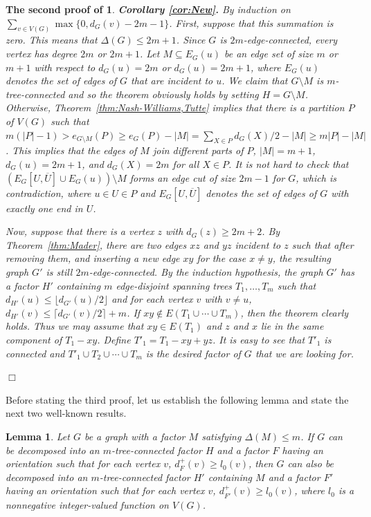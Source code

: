 \documentclass[10pt,bezier]{article}
\newtheorem{prelem}[prethm]{{\bf Lemma}}
\newenvironment{lem}{\begin{prelem}{\hspace{-0.5
em}{\bf.}}}{\end{prelem}}
\newtheorem{preproofs}{{\bf The second proof of }}
\newenvironment{proofs}[1]{\begin{preproofs}{\rm
#1}\hfill{$\Box$}}{\end{preproofs}}
\begin{document}
\begin{proofs}{
\noindent
\hspace*{-4mm}
\textbf{Corollary \ref{cor:New}.}
By induction on $\sum _{v\in V(G)}\max\{0, d_G(v)-2m-1\}$.
%
First, suppose that this summation is zero. This means that $\Delta(G)\le 2m+1$.
Since $G$ is $2m$-edge-connected, every vertex has degree $2m$ or $2m+1$.
Let $M\subseteq E_G(u)$ be an edge set of size 
$m$ or $m+1$ with respect to $d_G(u)=2m$ or $d_G(u)=2m+1$, 
where $E_G(u)$ denotes the set of edges of $G$ that are incident to $u$.
We claim that $G\setminus M$ is $m$-tree-connected and so the theorem obviously holds by setting $H=G\setminus M$.
Otherwise, Theorem~\ref{thm:Nash-Williams,Tutte} implies that there is a 
partition $P$ of $V(G)$
such that 
$m(|P|-1) > e_{G\setminus M}(P) \ge e_G(P)-|M|= \sum_{X\in P}d_G(X)/2-|M|\ge m|P|-|M|$.
This implies that the edges of $M$ join different parts of $P$,
$|M|=m+1$, $d_G(u)=2m+1$, and $d_G(X)=2m$ for all $X\in P$.
It is not hard to check that 
 $(E_G[U,\overline{U}]\cup E_G(u))\setminus M$ forms an edge cut of size $2m-1$ for $G$, which is contradiction, where $u\in U\in P$ and $E_G[U,\overline{U}]$ denotes the set of edges of $G$ with exactly one end in $U$.
%

Now, suppose that there is a vertex $z$ with $d_G(z)\ge 2m+2$. 
By Theorem~\ref{thm:Mader}, there are two edges $xz$ and $yz$ incident to $z$ such that 
after removing them, and inserting a new edge $xy$ for the case $x\neq y$, 
the resulting graph $G'$ is still $2m$-edge-connected.
By the induction hypothesis, the graph $G'$ has a factor $H'$ containing $m$ edge-disjoint spanning trees 
$T_1,\ldots, T_m$ such that $d_{H'}(u)\le \lfloor d_{G'}(u)/2\rfloor$ and for each vertex $v$ with $v\neq u$, $d_{H'}(v)\le \lceil d_{G'}(v)/2\rceil+m$. 
If $xy \not \in E(T_1\cup \cdots \cup T_m)$, then the theorem clearly holds. 
Thus we may assume that $xy\in E(T_1)$ and $z$ and $x$ lie in the same component of $T_1-xy$. 
Define $T'_1= T_1-xy+yz$. 
It is easy to see that $T'_1$ is connected and $T'_1\cup T_2\cup \cdots \cup T_m$ 
is the desired factor of $G$ that we are looking for.
}\end{proofs}
%
Before stating the third proof, let us establish the following lemma and state the next two well-known results.
%
\begin{lem}\label{lem:l0}
{Let $G$ be a graph with a factor $M$ satisfying $\Delta(M) \le m$. 
If $G$ can be decomposed into an $m$-tree-connected factor $H$ and a factor $F$ having an orientation such that for each vertex $v$, $d^+_F(v)\ge l_0(v)$, then $G$ can also be decomposed into an $m$-tree-connected factor $H'$ containing $M$ and a factor $F'$ having an orientation such that for each vertex $v$, $d^+_{F'}(v)\ge l_0(v)$, where $l_0$ is a nonnegative integer-valued function on $V(G)$.
}\end{lem}
\end{document}
